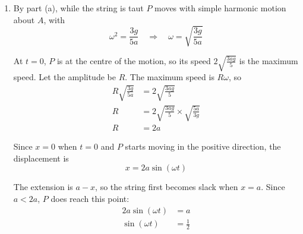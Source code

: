 \documentclass[leqno]{article}
\begin{document}
\begin{enumerate}[
  label=\textbf{\arabic*.},
  leftmargin=*,
  topsep=0pt,
  partopsep=0pt,
  parsep=0pt
]
\begin{djsSolution}
\begin{enumerate}[label=\textbf{(\alph*)}, start=1]
Let the extension at \(A\) be \(e_0\). Resolving parallel to the plane for the equilibrium at \(A\):
\begin{align*}
\frac{3mg e_0}{5a}&=mg\sin\alpha\\
\frac{3mg e_0}{5a}&=\frac{3mg}{5}\\
e_0&=a
\end{align*}

When the displacement of \(P\) from \(A\) is \(x\) up the plane, the extension is \(a-x\), so while the string is taut the tension, acting up the plane, is
\[
T=\frac{3mg(a-x)}{5a}
\]

The component of the weight down the plane is \(mg\sin\alpha=\frac{3mg}{5}\), and the normal reaction has no component along the plane.

Using Newton's second law, with acceleration \(\frac{\mathrm{d}^2x}{\mathrm{d}t^2}\):
\begin{align*}
m\frac{\mathrm{d}^2x}{\mathrm{d}t^2}&=\frac{3mg(a-x)}{5a}-\frac{3mg}{5}\\
m\frac{\mathrm{d}^2x}{\mathrm{d}t^2}&=\frac{3mg}{5}-\frac{3mgx}{5a}-\frac{3mg}{5}\\
\frac{\mathrm{d}^2x}{\mathrm{d}t^2}&=-\frac{3gx}{5a}\\
\frac{\mathrm{d}^2x}{\mathrm{d}t^2}+\frac{3gx}{5a}&=0
\end{align*}

as required.

\item By part (a), while the string is taut \(P\) moves with simple harmonic motion about \(A\), with
\[
\omega^2=\frac{3g}{5a}\quad\Longrightarrow\quad \omega=\sqrt{\frac{3g}{5a}}
\]

At \(t=0\), \(P\) is at the centre of the motion, so its speed \(2\sqrt{\frac{3ag}{5}}\) is the maximum speed. Let the amplitude be \(R\). The maximum speed is \(R\omega\), so
\begin{align*}
R\sqrt{\frac{3g}{5a}}&=2\sqrt{\frac{3ag}{5}}\\
R&=2\sqrt{\frac{3ag}{5}}\times\sqrt{\frac{5a}{3g}}\\
R&=2a
\end{align*}

Since \(x=0\) when \(t=0\) and \(P\) starts moving in the positive direction, the displacement is
\[
x=2a\sin(\omega t)
\]

The extension is \(a-x\), so the string first becomes slack when \(x=a\). Since \(a<2a\), \(P\) does reach this point:
\begin{align*}
2a\sin(\omega t)&=a\\
\sin(\omega t)&=\frac{1}{2}
\end{align*}


\end{enumerate}
\end{djsSolution}
\end{enumerate}
\end{document}
